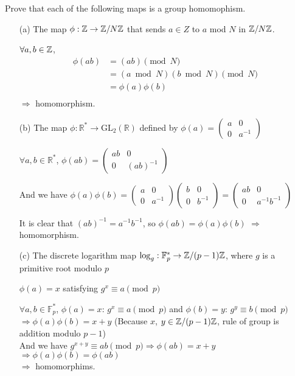 \begin{exer}[2.14]
Prove that each of the following maps is a group homomophism.

\begin{enumerate}
    \item [(a)] The map $\phi: \mathbb{Z} \rightarrow \mathbb{Z}/N\mathbb{Z}$ that sends $a \in Z$ to $a$ mod $N$ in $\mathbb{Z}/N\mathbb{Z}$.
    
    $\forall a, b \in \mathbb{Z}$, 
    \begin{align*}
         \phi(ab) &= (ab) \pmod N\\
         &= (a \bmod N)(b \bmod N) \pmod N \\
         &= \phi(a)\phi(b) \\ 
    \end{align*}
   $\Rightarrow$ homomorphism.
    
    \item [(b)] The map $\phi: \mathbb{R}^* \rightarrow \text{GL}_2(\mathbb{R})$ defined by $\phi(a) = \begin{pmatrix}a & 0 \\ 0 & a^{-1}\end{pmatrix}$
    
    $\forall a, b \in \mathbb{R}^*$, $\phi(ab)=\begin{pmatrix}ab & 0 \\ 0 & (ab)^{-1}\end{pmatrix}$
    
    And we have $\phi(a)\phi(b) = \begin{pmatrix}a & 0 \\ 0 & a^{-1}\end{pmatrix}\begin{pmatrix}b & 0 \\ 0 & b^{-1}\end{pmatrix} = \begin{pmatrix}ab & 0 \\ 0 & a^{-1}b^{-1}\end{pmatrix}$
    
    It is clear that $(ab)^{-1} = a^{-1}b^{-1}$, so $\phi(ab) = \phi(a)\phi(b)$ $\Rightarrow$ homomorphism.
    
    \item [(c)] The discrete logarithm map $\log_g: \mathbb{F}_p^* \rightarrow \mathbb{Z}/(p-1)\mathbb{Z}$, where $g$ is a primitive root modulo $p$
    
    $\phi(a) = x$ satisfying $g^x \equiv a \pmod p$
    
    $\forall a, b \in \mathbb{F}_p^*$, $\phi(a) = x$: $g^x \equiv a \pmod p$ and $\phi(b) = y$: $g^y \equiv b \pmod p$ \\ $\Rightarrow \phi(a)\phi(b) = x+y$ (Because $x$, $y \in \mathbb{Z}/(p-1)\mathbb{Z}$, rule of group is addition modulo $p-1$) \\ And we have $g^{x+y} \equiv ab \pmod p \Rightarrow \phi(ab)=x+y$ \\ $\Rightarrow \phi(a)\phi(b) = \phi(ab)$ \\ $\Rightarrow$ homomorphims.
    \end{enumerate}
\end{exer}

